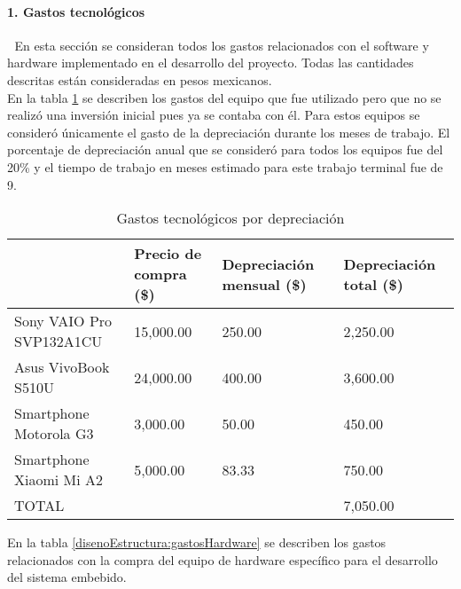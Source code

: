 \paragraph{1. Gastos tecnológicos} \textcolor{White}{.} \newline
En esta sección se consideran todos los gastos relacionados con el software y hardware implementado en el desarrollo del proyecto. Todas las cantidades descritas están consideradas en pesos mexicanos.\\

En la tabla \ref{disenoEstructura:gastosDepreciacion} se describen los gastos del equipo que fue utilizado pero que no se realizó una inversión inicial pues ya se contaba con él. Para estos equipos se consideró únicamente el gasto de la depreciación durante los meses de trabajo. El porcentaje de depreciación anual que se consideró para todos los equipos fue del 20\% y el tiempo de trabajo en meses estimado para este trabajo terminal fue de 9.

\begin{table}[htbp]
	\begin{center}
		\begin{tabular}{|p{4cm}|p{3cm}|p{3cm}|p{3cm}|}
			\hline
			\thead{Equipo}&\thead{Precio de compra\\(\$)}&\thead{Depreciación mensual\\(\$)}&\thead{Depreciación total\\(\$)} \\
			\hline
			\hline
			Sony VAIO Pro SVP132A1CU &15,000.00 &250.00&2,250.00 \\
			\hline
			Asus VivoBook S510U & 24,000.00&400.00&3,600.00 \\
			\hline
			Smartphone Motorola G3 &3,000.00 &50.00&450.00\\
			\hline
			Smartphone Xiaomi Mi A2 & 5,000.00&83.33&750.00\\
			\hline
			\hline
			TOTAL & &&7,050.00\\
			\hline
		\end{tabular}
		\caption{Gastos tecnológicos por depreciación}
		\label{disenoEstructura:gastosDepreciacion}
	\end{center}
\end{table}

En la tabla \ref{disenoEstructura:gastosHardware} se describen los gastos relacionados con la compra del equipo de hardware específico para el desarrollo del sistema embebido.

